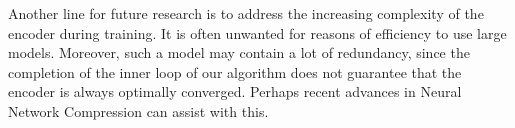 \documentclass[nohyperref]{article}
\theoremstyle{plain}
\theoremstyle{definition}
\theoremstyle{remark}
\begin{document}
Another line for future research is to address the increasing complexity of the encoder during training. It is often unwanted for reasons of efficiency to use large models. Moreover, such a model may contain a lot of redundancy, since the completion of the inner loop of our algorithm does not guarantee that the encoder is always optimally converged. Perhaps recent advances in Neural Network Compression can assist with this.



\end{document}

